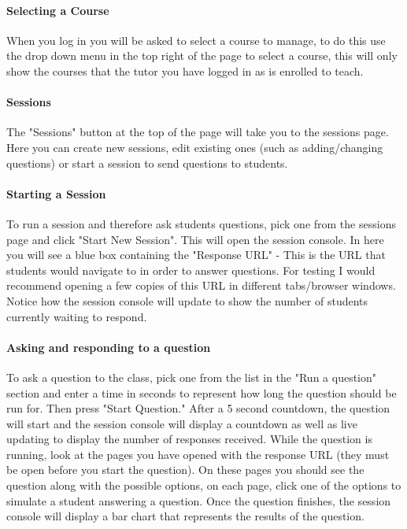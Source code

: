 \documentclass[10pt]{report}
\begin{document}
    \paragraph*{Selecting a Course}
    When you log in you will be asked to select a course to manage, to do this use the drop down menu in
    the top right of the page to select a course, this will only show the courses that the tutor you have
    logged in as is enrolled to teach.
    
    \paragraph*{Sessions}
	The "Sessions" button at the top of the page will take you to the sessions page.  Here you can create
	new sessions, edit existing ones (such as adding/changing questions) or start a session to send
	questions to students.
	
	\paragraph*{Starting a Session}
	To run a session and therefore ask students questions, pick one from the sessions page and click
	"Start New Session".  This will open the session console.  In here you will see a blue box containing
	the "Response URL" - This is the URL that students would navigate to in order to answer questions. For
	testing I would recommend opening a few copies of this URL in different tabs/browser windows.  Notice
	how the session console will update to show the number of students currently waiting to respond.
	
	\paragraph*{Asking and responding to a question}
	To ask a question to the class, pick one from the list in the "Run a question" section and enter a
	time in seconds to represent how long the question should be run for.  Then press "Start Question."
	After a 5 second countdown, the question will start and the session console will display a countdown
	as well as live updating to display the number of responses received.  While the question is running,
	look at the pages you have opened with the response URL (they must be open before you start the
	question).  On these pages you should see the question along with the possible options, on each page,
	click one of the options to simulate a student answering  a question.  Once the question finishes, the
	session console will display a bar chart that represents the results of the question.
	
\end{document}
